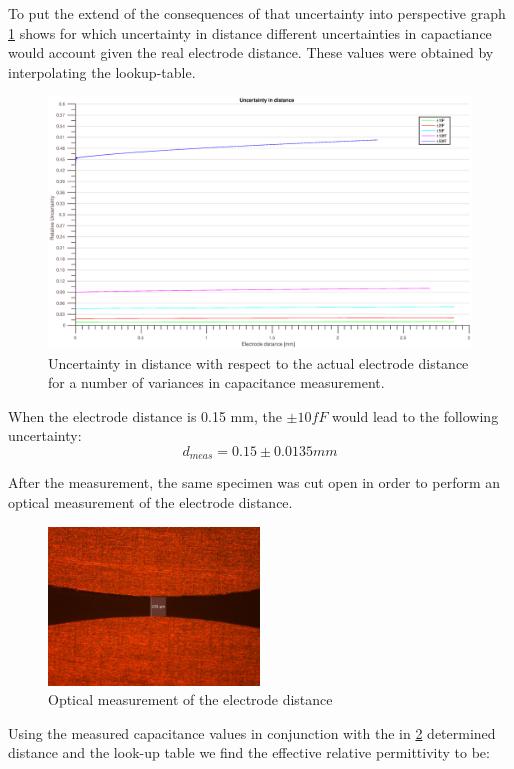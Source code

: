 To put the extend of the consequences of that uncertainty into perspective graph \ref{fig.uncertainty}
shows for which uncertainty in distance different uncertainties in capactiance would account given the real electrode distance. These values were obtained by
interpolating the lookup-table.

\begin{figure}[h!tb]
\includegraphics[width=\textwidth]{figures/Results/Capacitance_Measure/uncertainty2.eps}
\caption[Kurze Abbildungsbeschreibung]{Uncertainty in distance with respect to the
actual electrode distance for a number of variances in capacitance measurement.}
\label{fig.uncertainty}
\end{figure}

When the electrode distance is 0.15 mm, the $\pm10fF$ would lead to the following uncertainty:
\begin{equation}
 d_{meas}=0.15\pm0.0135 mm
\end{equation}


After the measurement, the same specimen was cut open in order to perform an optical measurement of the electrode distance.


\begin{figure}[ht]
	\centering
	\includegraphics[width=0.5\textwidth]{figures/Results/Capacitance_Measure/Sample1_scale.jpg}		
	\caption[Kurze Abbildungsbeschreibung]{Optical measurement of the electrode distance \protect\footnotemark} 
	\label{fig.opticalmeasurement}
\end{figure}
Using the measured capacitance values in conjunction with the in \ref{fig.opticalmeasurement} determined distance and the look-up table
we find the effective relative permittivity to be:

